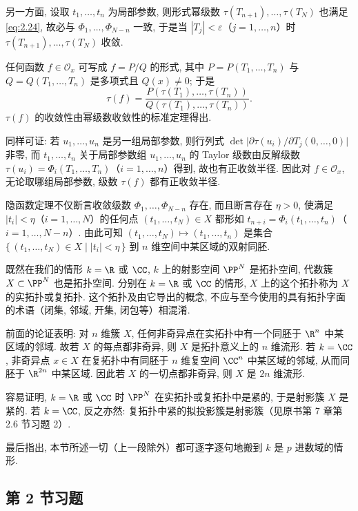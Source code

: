 另一方面, 设取 $t_1, \ldots, t_n$ 为局部参数, 则形式幂级数 $\tau(T_{n+1}), \ldots, \tau(T_N)$ 也满足 \eqref{eq:2.24}, 故必与 $\Phi_1, \ldots, \Phi_{N-n}$ 一致, 于是当 $|T_j| < \varepsilon$（$j = 1, \ldots, n$）时 $\tau(T_{n+1}), \ldots, \tau(T_N)$ 收敛.

任何函数 $f \in \mathcal O_x$ 可写成 $f = P/Q$ 的形式, 其中 $P = P(T_1, \ldots, T_n)$ 与 $Q = Q(T_1, \ldots, T_n)$ 是多项式且 $Q(x) \ne 0$; 于是
\[
	\tau(f) = \frac{P(\tau(T_1), \ldots, \tau(T_n))}{Q(\tau(T_1), \ldots, \tau(T_n))}.
\]
$\tau(f)$ 的收敛性由幂级数收敛性的标准定理得出.

同样可证: 若 $u_1, \ldots, u_n$ 是另一组局部参数, 则行列式 $\det \bigl| \partial \tau(u_i)/\partial T_j(0, \ldots, 0) \bigr|$ 非零, 而 $t_1, \ldots, t_n$ 关于局部参数组 $u_1, \ldots, u_n$ 的 Taylor 级数由反解级数 $\tau(u_i) = \Phi_i(T_1, \ldots, T_n)$（$i = 1, \ldots, n$）得到, 故也有正收敛半径. 因此对 $f \in \mathcal O_x$, 无论取哪组局部参数, 级数 $\tau(f)$ 都有正收敛半径.

隐函数定理不仅断言收敛级数 $\Phi_1, \ldots, \Phi_{N-n}$ 存在, 而且断言存在 $\eta > 0$, 使满足 $|t_i| < \eta$（$i = 1, \ldots, N$）的任何点 $(t_1, \ldots, t_N) \in X$ 都形如 $t_{n+i} = \Phi_i(t_1, \ldots, t_n)$（$i = 1, \ldots, N-n$）. 由此可知 $(t_1, \ldots, t_N) \mapsto (t_1, \ldots, t_n)$ 是集合 $\{\, (t_1, \ldots, t_N) \in X \mid |t_i| < \eta \,\}$ 到 $n$ 维空间中某区域的双射同胚.

既然在我们的情形 $k = \R$ 或 $\CC$, $k$ 上的射影空间 $\PP^N$ 是拓扑空间, 代数簇 $X \subset \PP^N$ 也是拓扑空间. 分别在 $k = \R$ 或 $\CC$ 的情形, $X$ 上的这个拓扑称为 $X$ 的实拓扑或复拓扑. 这个拓扑及由它导出的概念, 不应与至今使用的具有拓扑字面的术语（闭集, 邻域, 开集, 闭包等）相混淆.

前面的论证表明: 对 $n$ 维簇 $X$, 任何非奇异点在实拓扑中有一个同胚于 $\R^n$ 中某区域的邻域. 故若 $X$ 的每点都非奇异, 则 $X$ 是拓扑意义上的 $n$ 维流形. 若 $k = \CC$, 非奇异点 $x \in X$ 在复拓扑中有同胚于 $n$ 维复空间 $\CC^n$ 中某区域的邻域, 从而同胚于 $\R^{2n}$ 中某区域. 因此若 $X$ 的一切点都非奇异, 则 $X$ 是 $2n$ 维流形.

容易证明, $k = \R$ 或 $\CC$ 时 $\PP^N$ 在实拓扑或复拓扑中是紧的, 于是射影簇 $X$ 是紧的. 若 $k = \CC$, 反之亦然: 复拓扑中紧的拟投影簇是射影簇（见原书第 7 章第 2.6 节习题 2）.

最后指出, 本节所述一切（上一段除外）都可逐字逐句地搬到 $k$ 是 $p$ 进数域的情形.

\subsection{第 2 节习题}

